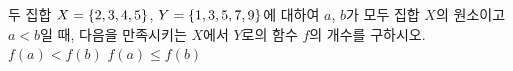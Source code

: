 두 집합 $X=\{2{,}\mkern3mu\mathopen{}3{,}\mkern3mu\mathopen{}4{,}\mkern3mu\mathopen{}5\}$, $Y=\{1{,}\mkern3mu\mathopen{}3{,}\mkern3mu\mathopen{}5{,}\mkern3mu\mathopen{}7{,}\mkern3mu\mathopen{}9\}$에 대하여 $a$, $b$가 모두 집합 $X$의 원소이고 $a<b$일 때, 다음을 만족시키는 $X$에서 $Y$로의 함수 $f$의 개수를 구하시오.
 $f(a)<f(b)$
 $f(a)\le f(b)$
